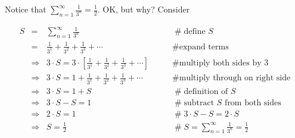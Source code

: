 \documentclass[11pt, oneside]{article}   	%
\begin{document}
Notice that  $\sum\limits_{n = 1}^\infty \frac{1}{3^n}  = \frac{1}{2}$. OK, but why? Consider 
      
\begin{equation*}
\begin{array}{lllll}
S
&=& \sum\limits_{n = 1}^\infty \frac{1}{3^n}                                                                             &\qquad  \mathrel{\#} \text{define $S$}                              \\ 
&=& \frac{1}{3^1} + \frac{1}{3^2} + \frac{1}{3^3} + \cdots                                                        &\qquad  \mathrel{\#} \text{expand terms}                          \\
&\Rightarrow& 3 \cdot S = 3 \cdot [\frac{1}{3^1} + \frac{1}{3^2} + \frac{1}{3^3} + \cdots ]      &\qquad  \mathrel{\#} \text{multiply both sides by 3}           \\
&\Rightarrow& 3 \cdot S = 1 + \frac{1}{3^1} + \frac{1}{3^2} + \frac{1}{3^3} + \cdots               &\qquad  \mathrel{\#} \text{multiply through on right side}  \\
&\Rightarrow& 3 \cdot S = 1 + S                                                                                             &\qquad  \mathrel{\#} \text{definition of $S$}                      \\
&\Rightarrow& 3 \cdot S - S = 1                                                                                              &\qquad  \mathrel{\#} \text{subtract $S$ from both sides}  \\
&\Rightarrow& 2 \cdot S  = 1                                                                                                  &\qquad  \mathrel{\#} 3 \cdot S - S = 2 \cdot S                    \\
&\Rightarrow& S  = \frac{1}{2}                                                                                                &\qquad  \mathrel{\#} S = \sum\limits_{n = 1}^\infty \frac{1}{3^n}  = \frac{1}{2}
\end{array}
\end{equation*}
\end{document}
